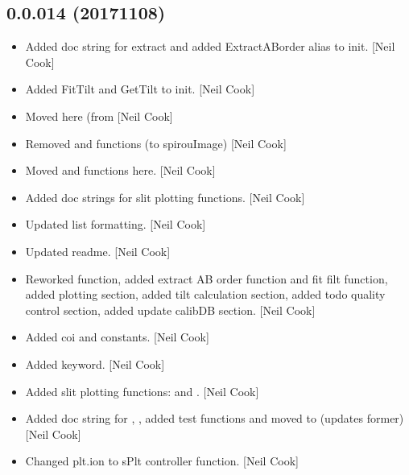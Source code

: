\documentclass[a4paper,10pt,english]{report}
\begin{document}
\subsection{0.0.014 (2017\sphinxhyphen{}11\sphinxhyphen{}08)}
\label{\detokenize{misc/changelog:id556}}\begin{itemize}
\item {} 
Added doc string for extract and added ExtractABorder alias to init.
{[}Neil Cook{]}

\item {} 
Added FitTilt and GetTilt to init. {[}Neil Cook{]}

\item {} 
Moved  here (from  {[}Neil Cook{]}

\item {} 
Removed  and  functions (to spirouImage) {[}Neil Cook{]}

\item {} 
Moved  and  functions here. {[}Neil Cook{]}

\item {} 
Added doc strings for slit plotting functions. {[}Neil Cook{]}

\item {} 
Updated  list formatting. {[}Neil Cook{]}

\item {} 
Updated readme. {[}Neil Cook{]}

\item {} 
Reworked  function, added extract AB order function and fit
filt function, added plotting section, added tilt calculation section,
added todo quality control section, added update calibDB section.
{[}Neil Cook{]}

\item {} 
Added coi  and  constants. {[}Neil Cook{]}

\item {} 
Added  keyword. {[}Neil Cook{]}

\item {} 
Added slit plotting functions:  and
. {[}Neil Cook{]}

\item {} 
Added doc string for , , added test
functions  and moved  to
 (updates former) {[}Neil Cook{]}

\item {} 
Changed plt.ion to sPlt controller function. {[}Neil Cook{]}

\end{itemize}
\end{document}

